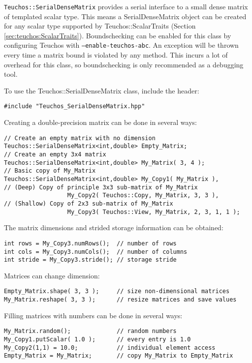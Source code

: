 \verb!Teuchos::SerialDenseMatrix! provides a serial interface to a small dense matrix
of templated scalar type.  This means a SerialDenseMatrix object can be created for any scalar type 
supported by Teuchos::ScalarTraits (Section \ref{sec:teuchos:ScalarTraits}).  Boundschecking
can be enabled for this class by configuring Teuchos with {\tt --enable-teuchos-abc}.
An exception will be thrown every time a matrix bound is violated by any method.  This 
incurs a lot of overhead for this class, so boundschecking is only recommended as a debugging tool.

To use the Teuchos::SerialDenseMatrix class, include the header:

{\small 
\begin{verbatim}
#include "Teuchos_SerialDenseMatrix.hpp"
\end{verbatim}}
Creating a double-precision matrix can be done in several ways:
{\small 
\begin{verbatim}
// Create an empty matrix with no dimension
Teuchos::SerialDenseMatrix<int,double> Empty_Matrix;
// Create an empty 3x4 matrix
Teuchos::SerialDenseMatrix<int,double> My_Matrix( 3, 4 );
// Basic copy of My_Matrix
Teuchos::SerialDenseMatrix<int,double> My_Copy1( My_Matrix ),
// (Deep) Copy of principle 3x3 sub-matrix of My_Matrix
                  My_Copy2( Teuchos::Copy, My_Matrix, 3, 3 ),
// (Shallow) Copy of 2x3 sub-matrix of My_Matrix
                  My_Copy3( Teuchos::View, My_Matrix, 2, 3, 1, 1 );
\end{verbatim}}
The matrix dimensions and strided storage information can be obtained:
{\small
\begin{verbatim}
int rows = My_Copy3.numRows();  // number of rows
int cols = My_Copy3.numCols();  // number of columns
int stride = My_Copy3.stride(); // storage stride
\end{verbatim}}
Matrices can change dimension:
{\small
\begin{verbatim}
Empty_Matrix.shape( 3, 3 );     // size non-dimensional matrices
My_Matrix.reshape( 3, 3 );      // resize matrices and save values
\end{verbatim}}
Filling matrices with numbers can be done in several ways:
{\small 
\begin{verbatim}
My_Matrix.random();             // random numbers
My_Copy1.putScalar( 1.0 );      // every entry is 1.0
My_Copy2(1,1) = 10.0;           // individual element access
Empty_Matrix = My_Matrix;       // copy My_Matrix to Empty_Matrix 
\end{verbatim}}
